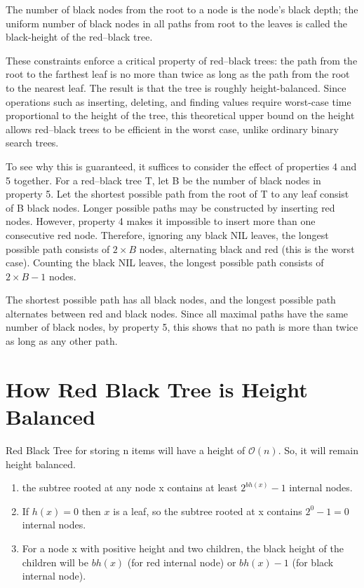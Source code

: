 \documentclass{article}[10pt]
\begin{document}
The number of black nodes from the root to a node is the node's black depth; the uniform number of black nodes in all paths from root to the leaves is called the black-height of the red–black tree.

These constraints enforce a critical property of red–black trees: the path from the root to the farthest leaf is no more than twice as long as the path from the root to the nearest leaf. The result is that the tree is roughly height-balanced. Since operations such as inserting, deleting, and finding values require worst-case time proportional to the height of the tree, this theoretical upper bound on the height allows red–black trees to be efficient in the worst case, unlike ordinary binary search trees.

To see why this is guaranteed, it suffices to consider the effect of properties 4 and 5 together. For a red–black tree T, let B be the number of black nodes in property 5. Let the shortest possible path from the root of T to any leaf consist of B black nodes. Longer possible paths may be constructed by inserting red nodes. However, property 4 makes it impossible to insert more than one consecutive red node. Therefore, ignoring any black NIL leaves, the longest possible path consists of $2 \times B$ nodes, alternating black and red (this is the worst case). Counting the black NIL leaves, the longest possible path consists of $2 \times B - 1$ nodes.

The shortest possible path has all black nodes, and the longest possible path alternates between red and black nodes. Since all maximal paths have the same number of black nodes, by property 5, this shows that no path is more than twice as long as any other path.

\section{How Red Black Tree is Height Balanced}

Red Black Tree for storing n items will have a height of $\mathcal{O}(n)$\cite{sedgewick2011algorithms}. So, it will remain height balanced.

    \begin{enumerate}
        \item the subtree rooted at any node x contains at least $2^{bh(x)} - 1$  internal nodes. 
        \item If $h(x) = 0$ then $x$ is a leaf, so the subtree rooted at x contains $2^0-1 = 0$ internal nodes.
        \item For a node x with positive height and two children, the black height of the children will be $ bh(x) $ (for red internal node) or  $bh(x) - 1$ (for black internal node).
        
        
    \end{enumerate}
    \begin{center}
        
        \vspace{1cm}
        
        \vspace{1cm}
        
            
    \end{center}
   
\end{document}
